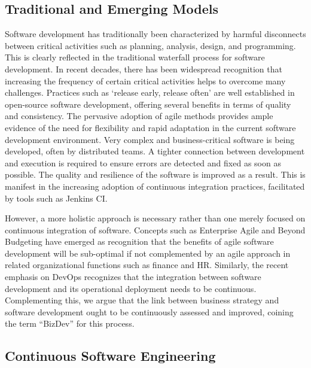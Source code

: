 \subsection{Traditional and Emerging Models}

Software development has traditionally been characterized by harmful disconnects between critical activities such as planning, analysis, design, and programming. This is clearly reflected in the traditional waterfall process for software development. In recent decades, there has been widespread recognition that increasing the frequency of certain critical activities helps to overcome many challenges. Practices such as ‘release early, release often’ are well established in open-source software development, offering several benefits in terms of quality and consistency. The pervasive adoption of agile methods provides ample evidence of the need for flexibility and rapid adaptation in the current software development environment. Very complex and business-critical software is being developed, often by distributed teams. A tighter connection between development and execution is required to ensure errors are detected and fixed as soon as possible. The quality and resilience of the software is improved as a result. This is manifest in the increasing adoption of continuous integration practices, facilitated by tools such as Jenkins CI.

However, a more holistic approach is necessary rather than one merely focused on continuous integration of software. Concepts such as Enterprise Agile and Beyond Budgeting have emerged as recognition that the benefits of agile software development will be sub-optimal if not complemented by an agile approach in related organizational functions such as finance and HR. Similarly, the recent emphasis on DevOps recognizes that the integration between software development and its operational deployment needs to be continuous. Complementing this, we argue that the link between business strategy and software development ought to be continuously assessed and improved, coining the term “BizDev” for this process.

\subsection{Continuous Software Engineering}

